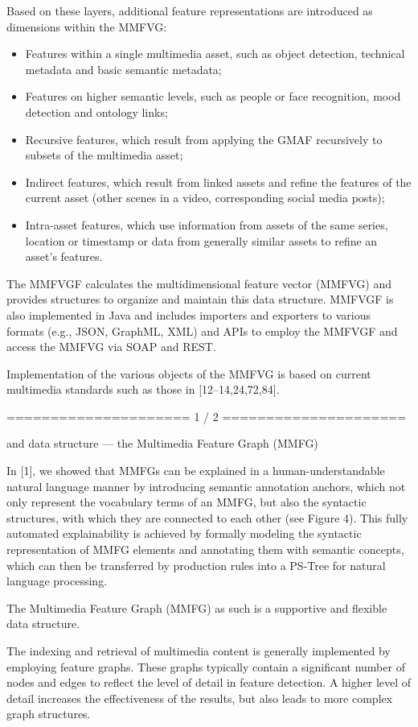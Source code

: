 Based on these
layers, additional feature representations are introduced as dimensions within the MMFVG:
\begin{itemize}
    \item Features within a single multimedia asset, such as object detection, technical metadata
and basic semantic metadata;
\item Features on higher semantic levels, such as people or face recognition, mood detection
and ontology links;
\item Recursive features, which result from applying the GMAF recursively to subsets of
the multimedia asset;
\item Indirect features, which result from linked assets and refine the features of the current
asset (other scenes in a video, corresponding social media posts);
\item Intra-asset features, which use information from assets of the same series, location or
timestamp or data from generally similar assets to refine an asset’s features.
\end{itemize}

The MMFVGF calculates the multidimensional feature vector (MMFVG) and provides
structures to organize and maintain this data structure. MMFVGF is also implemented
in Java and includes importers and exporters to various formats (e.g., JSON, GraphML,
XML) and APIs to employ the MMFVGF and access the MMFVG via SOAP and REST.

Implementation of the various objects of the MMFVG is based on current multimedia
standards such as those in [12–14,24,72,84].

===================== 1 / 2
=====================

and data structure — the Multimedia Feature Graph (MMFG)

In [1], we showed that MMFGs can be explained in a human-understandable natural
language manner by introducing semantic annotation anchors, which not only represent
the vocabulary terms of an MMFG, but also the syntactic structures, with which they are
connected to each other (see Figure 4). This fully automated explainability is achieved by
formally modeling the syntactic representation of MMFG elements and annotating them
with semantic concepts, which can then be transferred by production rules into a PS-Tree
for natural language processing.

The Multimedia Feature Graph (MMFG) as such is a supportive and flexible data structure.

The indexing and retrieval of multimedia content is generally implemented by employing
feature graphs. These graphs typically contain a significant number of nodes and edges to reflect the
level of detail in feature detection. A higher level of detail increases the effectiveness of the results,
but also leads to more complex graph structures.

